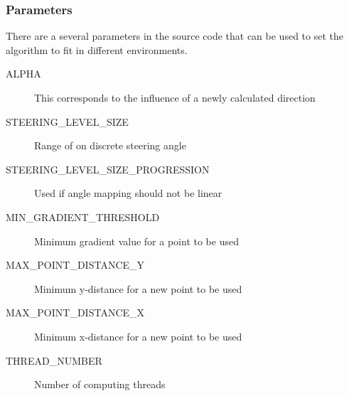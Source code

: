 \subsubsection{Parameters}
There are a several parameters in the source code that can be used to set the algorithm to fit in different environments.
\begin{description}
	\item [\small ALPHA] This corresponds to the influence of a newly calculated direction
	\item [\small STEERING\_LEVEL\_SIZE] Range of on discrete steering angle
	\item [\small STEERING\_LEVEL\_SIZE\_PROGRESSION] Used if angle mapping should not be linear
	\item [\small MIN\_GRADIENT\_THRESHOLD] Minimum gradient value for a point to be used
	\item [\small MAX\_POINT\_DISTANCE\_Y] Minimum y-distance for a new point to be used
	\item [\small MAX\_POINT\_DISTANCE\_X] Minimum x-distance for a new point to be used
	\item [\small THREAD\_NUMBER] Number of computing threads
\end{description}